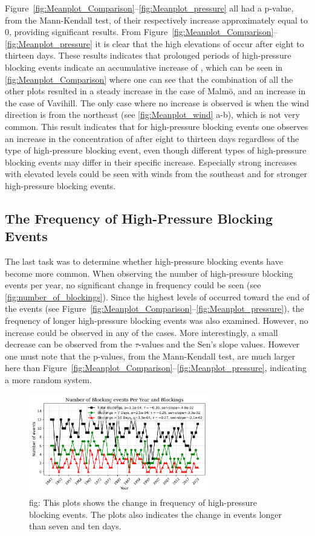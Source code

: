 Figure~\ref{fig:Meanplot_Comparison}--\ref{fig:Meanplot_pressure} all had a p-value, from the Mann-Kendall test, of their respectively increase approximately equal to 0, providing significant results. From Figure~\ref{fig:Meanplot_Comparison}--\ref{fig:Meanplot_pressure} it is clear that the high elevations of \PM occur after eight to thirteen days. These results indicates that prolonged periods of high-pressure blocking events indicate an accumulative increase of \PM, which can be seen in \autoref{fig:Meanplot_Comparison} where one can see that the combination of all the other plots resulted in a steady increase in the case of Malmö, and an increase in the case of Vavihill. The only case where no increase is observed is when the wind direction is from the northeast (see \autoref{fig:Meanplot_wind} a-b), which is not very common. This result indicates that for high-pressure blocking events one observes an increase in the concentration of \PM after eight to thirteen days regardless of the type of high-pressure blocking event, even though different types of high-pressure blocking events may differ in their specific increase. Especially strong increases with elevated \PM levels could be seen with winds from the southeast and for stronger high-pressure blocking events. 

\subsection{The Frequency of High-Pressure Blocking Events}
The last task was to determine whether high-pressure blocking events have become more common. When observing the number of high-pressure blocking events per year, no significant change in frequency could be seen (see \autoref{fig:number_of_blockings}). Since the highest levels of \PM  occurred toward the end of the events (see Figure~\ref{fig:Meanplot_Comparison}--\ref{fig:Meanplot_pressure}), the frequency of longer high-pressure blocking events was also examined. However, no increase could be observed in any of the cases. More interestingly, a small decrease can be observed from the $\tau$-values and the Sen's slope values. However one must note that the p-values, from the Mann-Kendall test, are much larger here than Figure~\ref{fig:Meanplot_Comparison}--\ref{fig:Meanplot_pressure}, indicating a more random system. 

\begin{figure}[H]
    \centering
    \includegraphics[width=0.7\textwidth]{Figures/BlockingsPerYear.png}
    \caption{fig: This plots shows the change in frequency of high-pressure blocking events. The plots also indicates the change in events longer than seven and ten days. }
    \label{fig:number_of_blockings}
\end{figure}

